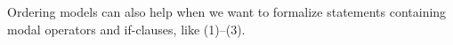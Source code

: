 


Ordering models can also help when we want to formalize statements containing
modal operators and if-clauses, like (1)--(3).

